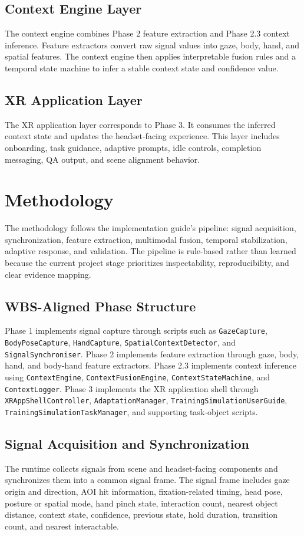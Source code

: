 \documentclass[conference]{IEEEtran}
\begin{document}
\subsection{Context Engine Layer}
The context engine combines Phase 2 feature extraction and Phase 2.3 context inference. Feature extractors convert raw signal values into gaze, body, hand, and spatial features. The context engine then applies interpretable fusion rules and a temporal state machine to infer a stable context state and confidence value.

\subsection{XR Application Layer}
The XR application layer corresponds to Phase 3. It consumes the inferred context state and updates the headset-facing experience. This layer includes onboarding, task guidance, adaptive prompts, idle controls, completion messaging, QA output, and scene alignment behavior.

\section{Methodology}
The methodology follows the implementation guide's pipeline: signal acquisition, synchronization, feature extraction, multimodal fusion, temporal stabilization, adaptive response, and validation. The pipeline is rule-based rather than learned because the current project stage prioritizes inspectability, reproducibility, and clear evidence mapping.

\subsection{WBS-Aligned Phase Structure}
Phase 1 implements signal capture through scripts such as \texttt{GazeCapture}, \texttt{BodyPoseCapture}, \texttt{HandCapture}, \texttt{SpatialContextDetector}, and \texttt{SignalSynchroniser}. Phase 2 implements feature extraction through gaze, body, hand, and body-hand feature extractors. Phase 2.3 implements context inference using \texttt{ContextEngine}, \texttt{ContextFusionEngine}, \texttt{ContextStateMachine}, and \texttt{ContextLogger}. Phase 3 implements the XR application shell through \texttt{XRAppShellController}, \texttt{AdaptationManager}, \texttt{TrainingSimulationUserGuide}, \texttt{TrainingSimulationTaskManager}, and supporting task-object scripts.

\subsection{Signal Acquisition and Synchronization}
The runtime collects signals from scene and headset-facing components and synchronizes them into a common signal frame. The signal frame includes gaze origin and direction, AOI hit information, fixation-related timing, head pose, posture or spatial mode, hand pinch state, interaction count, nearest object distance, context state, confidence, previous state, hold duration, transition count, and nearest interactable.
\end{document}

